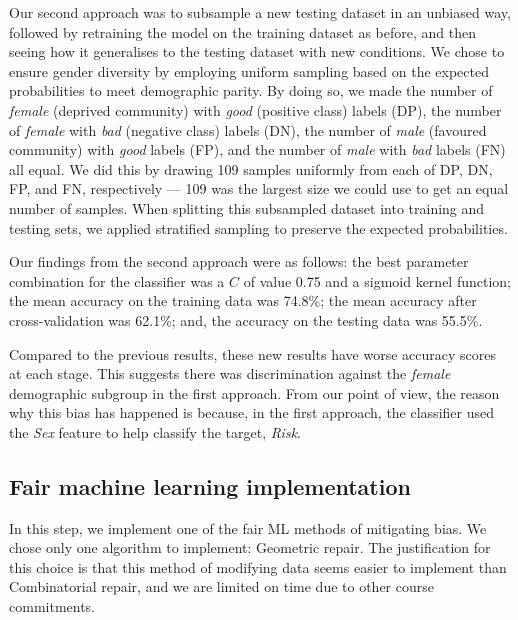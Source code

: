 \documentclass[conference]{IEEEtran}
\begin{document}
Our second approach was to subsample a new testing dataset in an unbiased way, followed by retraining the model on the training dataset as before, and then seeing how it generalises to the testing dataset with new conditions. We chose to ensure gender diversity by employing uniform sampling \cite{Kamiran2011} based on the expected probabilities to meet demographic parity. By doing so, we made the number of \emph{female} (deprived community) with \emph{good} (positive class) labels (DP), the number of \emph{female} with \emph{bad} (negative class) labels (DN), the number of \emph{male} (favoured community) with \emph{good} labels (FP), and the number of \emph{male} with \emph{bad} labels (FN) all equal. We did this by drawing 109 samples uniformly from each of DP, DN, FP, and FN, respectively --- 109 was the largest size we could use to get an equal number of samples. When splitting this subsampled dataset into training and testing sets, we applied stratified sampling to preserve the expected probabilities.

Our findings from the second approach were as follows: the best parameter combination for the classifier was a $C$ of value 0.75 and a sigmoid kernel function; the mean accuracy on the training data was 74.8\%; the mean accuracy after cross-validation was 62.1\%; and, the accuracy on the testing data was 55.5\%.

Compared to the previous results, these new results have worse accuracy scores at each stage. This suggests there was discrimination against the \emph{female} demographic subgroup in the first approach. From our point of view, the reason why this bias has happened is because, in the first approach, the classifier used the \emph{Sex} feature to help classify the target, \emph{Risk}.

\subsection{Fair machine learning implementation}
In this step, we implement one of the fair ML methods of mitigating bias. We chose only one algorithm to implement: Geometric repair. The justification for this choice is that this method of modifying data seems easier to implement than Combinatorial repair, and we are limited on time due to other course commitments.
\end{document}
